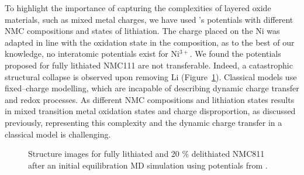 \documentclass[journal=jacsat,manuscript=article]{achemso}
\begin{document}
To highlight the importance of capturing the complexities of layered oxide materials, such as mixed metal charges, we have used \citeauthor{Lee_and_Park_2012}'s potentials with different NMC compositions and states of lithiation. The charge placed on the Ni was adapted in line with the oxidation state in the composition, as to the best of our knowledge, no interatomic potentials exist for Ni$^{3+}$.
We found the potentials proposed for fully lithiated NMC111 are not transferable.
Indeed, a catastrophic structural collapse is observed upon removing Li (Figure~\ref{fig:structure_collapse}). 
Classical models use fixed--charge modelling, which are incapable of describing dynamic charge transfer and redox processes.
As different NMC compositions and lithiation states results in mixed transition metal oxidation states and charge disproportion, as discussed previously, representing this complexity and the dynamic charge transfer in a classical model is challenging.\cite{Nakamura_2019,Kim_2002,Alonso_1999}


\begin{figure}[h]
  \centering
    \caption{\label{fig:structure_collapse} Structure images for fully lithiated and 20 \% delithiated NMC811 after an initial equilibration MD simulation using potentials from \citeauthor{Lee_and_Park_2012}.\cite{Lee_and_Park_2012} }
\end{figure}
\end{document}
